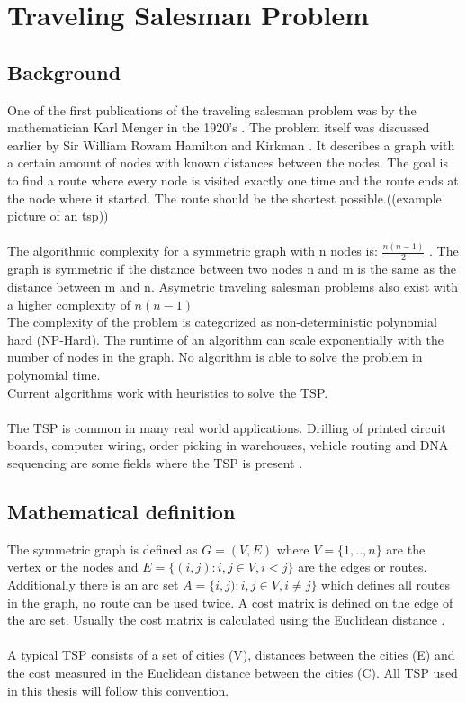 \chapter{Traveling Salesman Problem}
\label{chap:tsp}
\section{Background}
One of the first publications of the traveling salesman problem was by the mathematician Karl Menger in the 1920's \cite{Applegate}. The problem itself was discussed earlier by Sir William Rowam Hamilton and Kirkman \cite{Matai10}. It describes a graph with a certain amount of nodes with known distances between the nodes. The goal is to find a route where every node is visited exactly one time and the route ends at the node where it started. The route should be the shortest possible.((example picture of an tsp))\\\\
The algorithmic complexity for a symmetric graph with n nodes is: $\frac{n(n-1)}{2}$ \cite{Applegate}.
The graph is symmetric if the distance between two nodes n and m is the same as the distance between m and n. Asymetric traveling salesman problems also exist with a higher complexity of $n(n-1)$\\
The complexity of the problem is categorized as non-deterministic polynomial hard (NP-Hard). The runtime of an algorithm can scale exponentially with the number of nodes in the graph. No algorithm is able to solve the problem in polynomial time.\\
Current algorithms work with heuristics to solve the TSP.\\\\
The TSP is common in many real world applications. Drilling of printed circuit boards, computer wiring, order picking in warehouses, vehicle routing and DNA sequencing are some fields where the TSP is present \cite{Matai10}.
\section{Mathematical definition}
The symmetric graph is defined as $G=(V,E)$ where $V=\{1,..,n\}$ are the vertex or the nodes and $E=\{(i,j):i,j\in V, i<j\}$ are the edges or routes. Additionally there is an arc set $A=\{i,j):i,j\in V, i\neq j\}$ which defines all routes in the graph, no route can be used twice. A cost matrix is defined on the edge of the arc set. Usually the cost matrix is calculated using the Euclidean distance \cite{Matai10}.\\\\
A typical TSP consists of a set of cities (V), distances between the cities (E) and the cost measured in the Euclidean distance between the cities (C). All TSP used in this thesis will follow this convention. 


 


